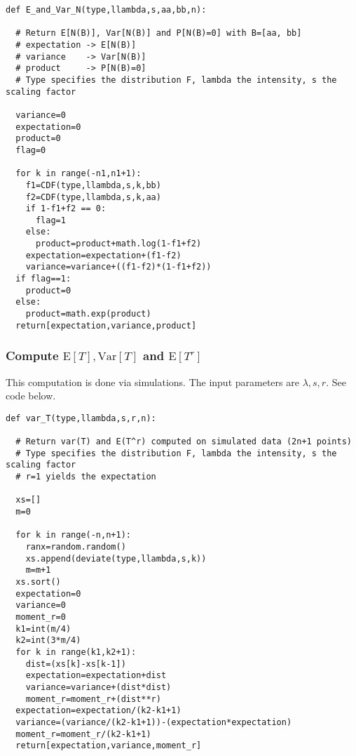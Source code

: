 \documentclass[10pt]{article}
\begin{document}
\begin{lstlisting}
def E_and_Var_N(type,llambda,s,aa,bb,n):

  # Return E[N(B)], Var[N(B)] and P[N(B)=0] with B=[aa, bb]
  # expectation -> E[N(B)]
  # variance    -> Var[N(B)]
  # product     -> P[N(B)=0]
  # Type specifies the distribution F, lambda the intensity, s the scaling factor

  variance=0
  expectation=0
  product=0
  flag=0

  for k in range(-n1,n1+1):
    f1=CDF(type,llambda,s,k,bb)
    f2=CDF(type,llambda,s,k,aa)
    if 1-f1+f2 == 0:
      flag=1
    else:
      product=product+math.log(1-f1+f2)
    expectation=expectation+(f1-f2)
    variance=variance+((f1-f2)*(1-f1+f2))
  if flag==1:
    product=0
  else:
    product=math.exp(product)
  return[expectation,variance,product]
\end{lstlisting}
\subsubsection{Compute $\mbox{E}[T], \mbox{Var}[T]$ and $\mbox{E}[T^r]$} \label{evm}
This computation is done via simulations. The input parameters are $\lambda,s, r$. See code below.

\begin{lstlisting}
def var_T(type,llambda,s,r,n):

  # Return var(T) and E(T^r) computed on simulated data (2n+1 points)
  # Type specifies the distribution F, lambda the intensity, s the scaling factor
  # r=1 yields the expectation

  xs=[]
  m=0

  for k in range(-n,n+1):
    ranx=random.random()
    xs.append(deviate(type,llambda,s,k))
    m=m+1
  xs.sort()
  expectation=0
  variance=0
  moment_r=0
  k1=int(m/4)
  k2=int(3*m/4)
  for k in range(k1,k2+1):
    dist=(xs[k]-xs[k-1])
    expectation=expectation+dist
    variance=variance+(dist*dist)
    moment_r=moment_r+(dist**r)
  expectation=expectation/(k2-k1+1)
  variance=(variance/(k2-k1+1))-(expectation*expectation)
  moment_r=moment_r/(k2-k1+1)
  return[expectation,variance,moment_r]

\end{lstlisting}
\end{document}
